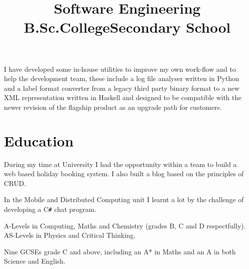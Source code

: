 \documentclass[line,margin]{res}
\newcommand{\CSharp}{C\texttt{\#}}
\begin{document}
\begin{resume}
\begin{position}
I have developed some in-house utilities to improve my own work-flow and to help the development team, these include a log file analyser written in Python and a label format converter from a legacy third party binary format to a new XML representation written in Haskell and designed to be compatible with the newer revision of the flagship product as an upgrade path for customers.
\end{position}

\section{Education}

\title{Software Engineering B.Sc.} %
\begin{position}
During my time at University I had the opportunity within a team to build a web based holiday booking system.
I also built a blog based on the principles of CRUD.

In the Mobile and Distributed Computing unit I learnt a lot by the challenge of developing a {\CSharp} chat program.
\end{position}

\title{College}
\begin{position}
A-Levels in Computing, Maths and Chemistry (grades B, C and D respectfully). \\
AS-Levels in Physics and Critical Thinking.

\begin{comment}
\begin{tabular}{ l r r }
	Computing & A Level & B \\
	Maths & A Level & C \\
	Chemistry & A Level & D \\
	Physics & AS Level & D \\
	Critical Thinking & AS Level & E \\
\end{tabular}
\end{comment}
\end{position}

\title{Secondary School}
\begin{position}
Nine GCSEs grade C and above, including an A* in Maths and an A in both Science and English.


\end{position}
\end{resume}
\end{document}
